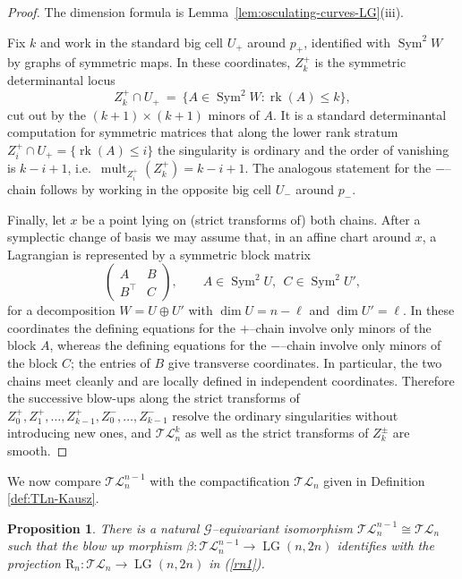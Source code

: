 \documentclass[10pt]{amsart}
\newtheorem{proposition}[theorem]{Proposition}
\theoremstyle{definition}
\newcommand{\LG}{\operatorname{LG}}
\DeclareMathOperator{\Sym}{Sym}
\DeclareMathOperator{\rk}{rk}
\DeclareMathOperator{\mult}{mult}
\newcommand{\TL}{\mathcal{TL}}
\newcommand{\RL}{\mathrm{R}}
\theoremstyle{plain} %
\begin{document}
\begin{proof}
The dimension formula is Lemma~\ref{lem:osculating-curves-LG}\textup{(iii)}.

Fix $k$ and work in the standard big cell $U_+$ around $p_+$, identified with $\Sym^2 W$ by graphs of symmetric maps.
In these coordinates, $Z_k^+$ is the symmetric determinantal locus
\[
Z_k^+ \cap U_+ \ =\ \{A\in \Sym^2 W : \rk(A)\le k\},
\]
cut out by the $(k+1)\times (k+1)$ minors of $A$. It is a standard determinantal computation for symmetric matrices that along the lower rank stratum
$Z_i^+\cap U_+=\{\rk(A)\le i\}$ the singularity is ordinary and the order of vanishing is $k-i+1$, i.e.\ $\mult_{Z_i^+}(Z_k^+)=k-i+1$.
The analogous statement for the $-$--chain follows by working in the opposite big cell $U_-$ around $p_-$.

Finally, let $x$ be a point lying on (strict transforms of) both chains. After a symplectic change of basis we may assume that, in an affine chart around $x$, a Lagrangian is represented by a symmetric block matrix
\[
\begin{pmatrix}
A & B\\
B^{\top} & C
\end{pmatrix},
\qquad
A\in \Sym^2 U,\ \ C\in \Sym^2 U',
\]
for a decomposition $W=U\oplus U'$ with $\dim U=n-\ell$ and $\dim U'=\ell$.
In these coordinates the defining equations for the $+$--chain involve only minors of the block $A$, whereas the defining equations for the $-$--chain involve only minors of the block $C$; the entries of $B$ give transverse coordinates.
In particular, the two chains meet cleanly and are locally defined in independent coordinates. Therefore the successive blow-ups along the strict transforms of
$Z_0^+,Z_1^+,\dots,Z_{k-1}^+,Z_0^-,\dots,Z_{k-1}^-$ resolve the ordinary singularities without introducing new ones, and $\TL_n^k$ as well as the strict transforms of $Z_k^\pm$ are smooth.
\end{proof}


We now compare $\TL_n^{n-1}$ with the compactification $\TL_n$  given in Definition \ref{def:TLn-Kausz}.

\begin{proposition}\label{prop:TLn-blowup-equals-Kausz}
There is a natural $\mathscr{G}$--equivariant
isomorphism $\TL_n^{n-1} \cong \TL_n$ such that the blow up morphism $\beta\colon\TL_n^{n-1}\to\LG(n,2n)$ identifies with the projection
$\RL_n\colon\TL_n\to\LG(n,2n)$ in (\ref{rn1}).
\end{proposition}
\end{document}
